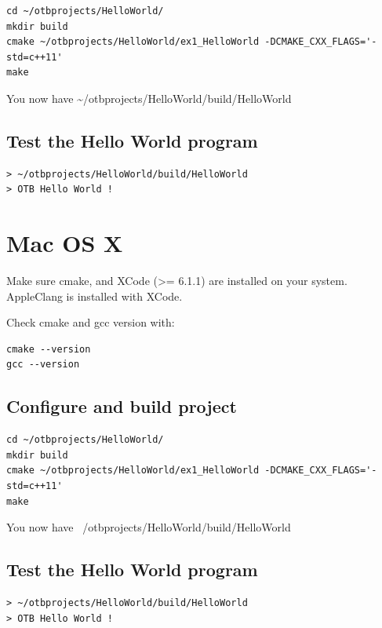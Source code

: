 \documentclass[10pt,a4paper]{article}
\begin{document}
\begin{verbatim}
cd ~/otbprojects/HelloWorld/
mkdir build
cmake ~/otbprojects/HelloWorld/ex1_HelloWorld -DCMAKE_CXX_FLAGS='-std=c++11'
make
\end{verbatim}

You now have \textasciitilde/otbprojects/HelloWorld/build/HelloWorld

\subsection{Test the Hello World program}

\begin{verbatim}
> ~/otbprojects/HelloWorld/build/HelloWorld
> OTB Hello World !
\end{verbatim}

\section{Mac OS X}

Make sure cmake, and XCode (>= 6.1.1) are installed on your
system. AppleClang is installed with XCode.

Check cmake and gcc version with:

\begin{verbatim}
cmake --version
gcc --version
\end{verbatim}

\subsection{Configure and build project}

\begin{verbatim}
cd ~/otbprojects/HelloWorld/
mkdir build
cmake ~/otbprojects/HelloWorld/ex1_HelloWorld -DCMAKE_CXX_FLAGS='-std=c++11'
make
\end{verbatim}

You now have ~/otbprojects/HelloWorld/build/HelloWorld

\subsection{Test the Hello World program}

\begin{verbatim}
> ~/otbprojects/HelloWorld/build/HelloWorld
> OTB Hello World !
\end{verbatim}
\end{document}

